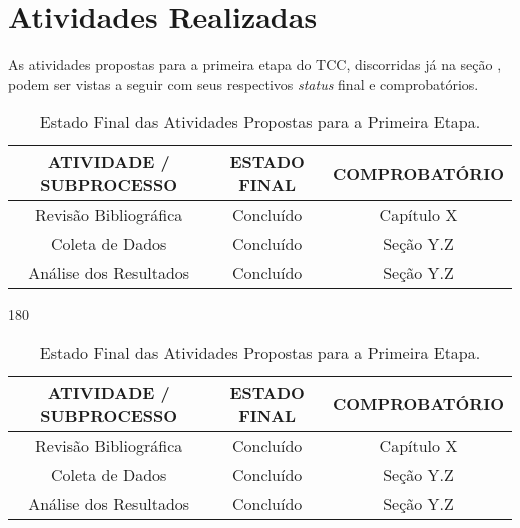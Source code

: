 \section{Atividades Realizadas}
\label{status-atividades-realizadas}

As atividades propostas para a primeira etapa do TCC, discorridas já na seção , podem ser vistas a seguir com seus respectivos \textit{status} final e comprobatórios.

\begin{sidewaystable}[h]
\centering
\ifodd\value{page}
\begin{turn}{0}
\begin{minipage}{\textwidth}
\centering
{\renewcommand{\arraystretch}{1.5}
\scriptsize
\caption[Estado Final das Atividades Primeira Etapa]{Estado Final das Atividades Propostas para a Primeira Etapa.}
\label{status-primeira-etapa}
\begin{tabular}{ccc}
\hline
\textbf{ATIVIDADE / SUBPROCESSO} & \textbf{ESTADO FINAL} & \textbf{COMPROBATÓRIO} \\ \hline
Revisão Bibliográfica & Concluído & Capítulo X \\ \hline
Coleta de Dados & Concluído & Seção Y.Z \\ \hline
Análise dos Resultados & Concluído & Seção Y.Z \\ \hline
\end{tabular}
}
\end{minipage}
\end{turn}
\else
\begin{turn}{180}
\begin{minipage}{\textwidth}
\centering
{\renewcommand{\arraystretch}{1.5}
\scriptsize
\caption[Estado Final das Atividades Primeira Etapa]{Estado Final das Atividades Propostas para a Primeira Etapa.}
\label{status-primeira-etapa}
\begin{tabular}{ccc}
\hline
\textbf{ATIVIDADE / SUBPROCESSO} & \textbf{ESTADO FINAL} & \textbf{COMPROBATÓRIO} \\ \hline
Revisão Bibliográfica & Concluído & Capítulo X \\ \hline
Coleta de Dados & Concluído & Seção Y.Z \\ \hline
Análise dos Resultados & Concluído & Seção Y.Z \\ \hline
\end{tabular}
}
\end{minipage}
\end{turn}
\fi
\end{sidewaystable}

